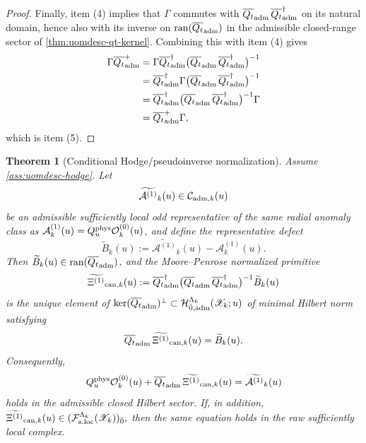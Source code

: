\documentclass[11pt]{article}
\theoremstyle{definition}
\theoremstyle{plain}
\newtheorem{theorem}[definition]{Theorem}
\theoremstyle{remark}
\newcommand{\Fsloc}{\mathcal F_{\rm s.loc}}
\newcommand{\Xscr}{\mathscr X}
\newcommand{\Ozero}{\mathcal O^{(0)}}
\newcommand{\Aone}{\mathcal A^{(1)}}
\newcommand{\Xione}{\Xi^{(1)}}
\newcommand{\Qt}{Q_t}
\newcommand{\Quphys}{Q_u^{\rm phys}}
\begin{document}
\begin{proof}
Finally, item (4) implies that \(\Gamma\) commutes with
\(\overline{\Qt}_{\rm adm}\,\overline{\Qt}_{\rm adm}^{\dagger}\) on its natural domain, hence also
with its inverse on \(\mathrm{ran}(\overline{\Qt}_{\rm adm})\) in the admissible closed-range
sector of \cref{thm:uomdesc-qt-kernel}.
Combining this with item (4) gives
\[
\begin{aligned}
\Gamma\overline{\Qt}_{\rm adm}^{+}
&=
\Gamma\overline{\Qt}_{\rm adm}^{\dagger}
\big(\overline{\Qt}_{\rm adm}\,\overline{\Qt}_{\rm adm}^{\dagger}\big)^{-1} \\
&=
\overline{\Qt}_{\rm adm}^{\dagger}\Gamma
\big(\overline{\Qt}_{\rm adm}\,\overline{\Qt}_{\rm adm}^{\dagger}\big)^{-1} \\
&=
\overline{\Qt}_{\rm adm}^{\dagger}
\big(\overline{\Qt}_{\rm adm}\,\overline{\Qt}_{\rm adm}^{\dagger}\big)^{-1}\Gamma \\
&=
\overline{\Qt}_{\rm adm}^{+}\Gamma,
\end{aligned}
\]
which is item (5).
\end{proof}

\begin{theorem}[Conditional Hodge/pseudoinverse normalization]
\label{thm:uomdesc-hodge}
Assume \cref{ass:uomdesc-hodge}.
Let
\[
\widetilde{\Aone}_k(u)\in\mathcal C_{{\rm adm},k}(u)
\]
be an admissible sufficiently local odd representative of the same radial anomaly class as
\(\Aone_k(u)=\Quphys\Ozero_k(u)\), and define the representative defect
\[
\widetilde{B}_k(u):=\widetilde{\Aone}_k(u)-\Aone_k(u).
\]
Then \(\widetilde{B}_k(u)\in\mathrm{ran}(\overline{\Qt}_{\rm adm})\), and the Moore--Penrose
normalized
primitive
\[
\widetilde{\Xione}_{{\rm can},k}(u)
:=
\overline{\Qt}_{\rm adm}^{\dagger}
\big(\overline{\Qt}_{\rm adm}\,\overline{\Qt}_{\rm adm}^{\dagger}\big)^{-1}
\widetilde{B}_k(u)
\]
is the unique element of
\(
\ker(\overline{\Qt}_{\rm adm})^\perp\subset
\mathcal H_{\bar 0,{\rm adm}}^{\Lambda_k}(\Xscr_k;u)
\)
of minimal Hilbert norm satisfying
\[
\overline{\Qt}_{\rm adm}\,\widetilde{\Xione}_{{\rm can},k}(u)=\widetilde{B}_k(u).
\]
Consequently,
\[
\Quphys\Ozero_k(u)+\overline{\Qt}_{\rm adm}\,\widetilde{\Xione}_{{\rm can},k}(u)
=
\widetilde{\Aone}_k(u)
\]
holds in the admissible closed Hilbert sector.
If, in addition,
\(
\widetilde{\Xione}_{{\rm can},k}(u)\in(\Fsloc^{\Lambda_k}(\Xscr_k))_{\bar 0},
\)
then the same equation holds in the raw sufficiently local complex.
\end{theorem}
\end{document}
